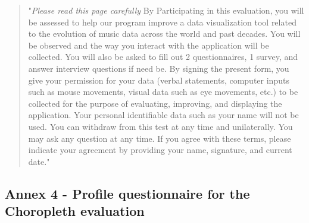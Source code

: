 \documentclass[twocolumn, letterpaper,13pt]{scrartcl}
\begin{document}
    \begin{quote}
        "\textit{Please read this page carefully}
        \newline\newline
        By Participating in this evaluation, you will be assessed to help our program improve a data visualization tool related to the evolution of music data across the world and past decades. You will be observed and the way you interact with the application will be collected. You will also be asked to fill out 2 questionnaires, 1 survey, and answer interview questions if need be.
        \newline\newline
        By signing the present form, you give your permission for your data (verbal statements, computer inputs such as mouse movements, visual data such as eye movements, etc.) to be collected for the purpose of evaluating, improving, and displaying the application. Your personal identifiable data such as your name will not be used.
        \newline\newline
        You can withdraw from this test at any time and unilaterally. You may ask any question at any time.
        \newline\newline
        If you agree with these terms, please indicate your agreement by providing your name, signature, and current date."
    \end{quote}
    
    \subsection*{Annex 4 - Profile questionnaire for the Choropleth evaluation}
    
\end{document}
